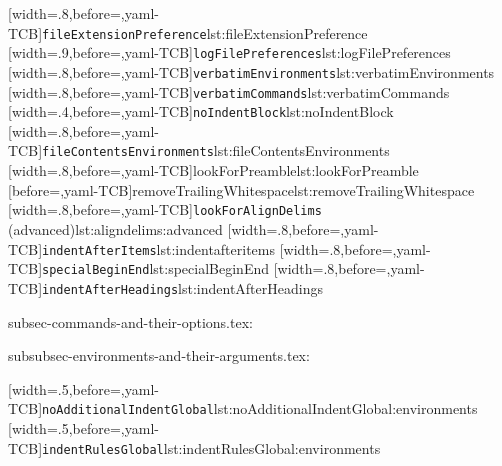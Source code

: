[width=.8\linewidth,before=\centering,yaml-TCB]{\texttt{fileExtensionPreference}}{lst:fileExtensionPreference}
[width=.9\linewidth,before=\centering,yaml-TCB]{\texttt{logFilePreferences}}{lst:logFilePreferences}
[width=.8\linewidth,before=\centering,yaml-TCB]{\texttt{verbatimEnvironments}}{lst:verbatimEnvironments}
[width=.8\linewidth,before=\centering,yaml-TCB]{\texttt{verbatimCommands}}{lst:verbatimCommands}
[width=.4\linewidth,before=\centering,yaml-TCB]{\texttt{noIndentBlock}}{lst:noIndentBlock}
[width=.8\linewidth,before=\centering,yaml-TCB]{\texttt{fileContentsEnvironments}}{lst:fileContentsEnvironments}
[width=.8\linewidth,before=\centering,yaml-TCB]{lookForPreamble}{lst:lookForPreamble}
[before=\centering,yaml-TCB]{removeTrailingWhitespace}{lst:removeTrailingWhitespace}
[width=.8\linewidth,before=\centering,yaml-TCB]{\texttt{lookForAlignDelims} (advanced)}{lst:aligndelims:advanced}
[width=.8\linewidth,before=\centering,yaml-TCB]{\texttt{indentAfterItems}}{lst:indentafteritems}
[width=.8\linewidth,before=\centering,yaml-TCB]{\texttt{specialBeginEnd}}{lst:specialBeginEnd}
[width=.8\linewidth,before=\centering,yaml-TCB]{\texttt{indentAfterHeadings}}{lst:indentAfterHeadings}

subsec-commands-and-their-options.tex:

subsubsec-environments-and-their-arguments.tex:

[width=.5\linewidth,before=\centering,yaml-TCB]{\texttt{noAdditionalIndentGlobal}}{lst:noAdditionalIndentGlobal:environments}
[width=.5\linewidth,before=\centering,yaml-TCB]{\texttt{indentRulesGlobal}}{lst:indentRulesGlobal:environments}

